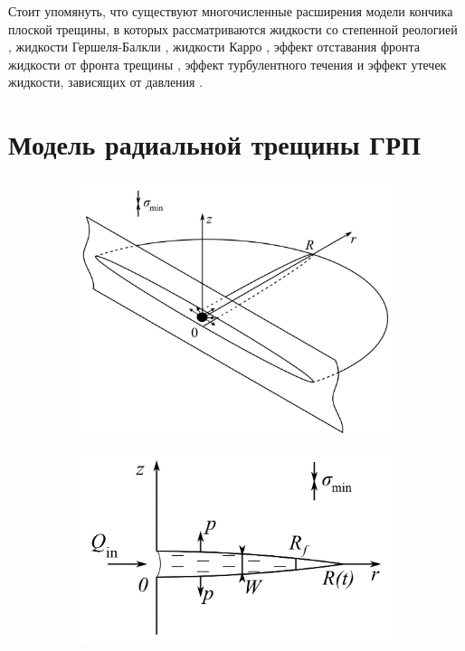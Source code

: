 Стоит упомянуть, что существуют многочисленные расширения модели кончика плоской трещины, в которых рассматриваются жидкости со степенной реологией \cite{dontsov_kresse}, жидкости Гершеля-Балкли \cite{bessmertnykh}, жидкости Карро \cite{moukhtari}, эффект отставания фронта жидкости от фронта трещины \cite{garagash}, эффект турбулентного течения \cite{dontsov_turbulent} и эффект утечек жидкости, зависящих от давления \cite{kanin}.

\section{Модель радиальной трещины ГРП}
\vspace*{-5mm}

\begin{figure}[H]
	\begin{subfigure}[t]{\dimexpr.5\linewidth-1.3em\relax}
		\centering
		\includegraphics[width=.95\linewidth,valign=t]{images/radial_model_3D.jpg}
	\end{subfigure}
\hfill %
	\begin{subfigure}[t]{\dimexpr.5\linewidth-1.3em\relax}
		\centering
		\includegraphics[width=.95\linewidth,valign=t]{images/radial_model_A-A_plane.jpg}

\end{subfigure}
\end{figure}
